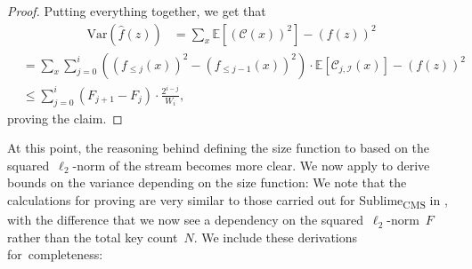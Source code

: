 \documentclass[sigconf]{acmart}
\newcommand{\sketch}{Sublime}
\newcommand{\sketchcms}{\sketch\textsubscript{CMS}\xspace}
\newcommand{\parentheses}[1]{\left(#1\right)}
\newcommand{\expectation}[1]{\mathbb{E}\left[ #1 \right]}
\newcommand{\variance}[1]{\mathrm{Var}\left( #1 \right)}
\begin{document}
\begin{proof}
    Putting everything together, we get that
    \begin{align*}
        \variance{\hat{f}(z)} &= \sum_x \expectation{\parentheses{\mathcal{C}(x)}^2} - (f(z))^2
    \end{align*}
    \begin{align*}
        & = \sum_x \sum_{j=0}^i \parentheses{(f_{\leq j}(x))^2  - (f_{\leq j-1}(x))^2} \cdot \expectation{ \mathcal{C}_{j,\mathcal{I}}(x)} - (f(z))^2 \\
        & \leq \sum_{j=0}^{i} \parentheses{F_{j+1} - F_j} \cdot \frac{2^{i-j}}{W_i},
    \end{align*}
    proving the claim.
\end{proof}

At this point, the reasoning behind defining the size function to based on the
squared~$\ell_2${\nobreakdash-}norm of the stream becomes more clear. We now
apply  to derive bounds on the variance depending on the size
function:
\thmcs*
We note that the calculations for proving  are very similar to
those carried out for \sketchcms in , with the difference that
we now see a dependency on the squared~$\ell_2${\nobreakdash-}norm~$F$ rather
than the total key count~$N$. We include these derivations for~completeness:
\end{document}
